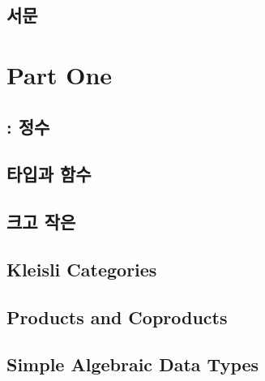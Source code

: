 


\frontmatter
\tableofcontents


\chapter*{서문}
\label{서문}


\mainmatter

\part*{Part One}

\chapter{\trCategory:  정수}\label{category-the-essence-of-composition}


\chapter{타입과 함수}\label{타입과 함수}


\chapter{크고 작은 \trCategory}\label{categories-great-and-small}


\chapter{Kleisli Categories}\label{kleisli-categories}


\chapter{Products and Coproducts}\label{products-and-coproducts}


\chapter{Simple Algebraic Data Types}\label{simple-algebraic-data-types}


